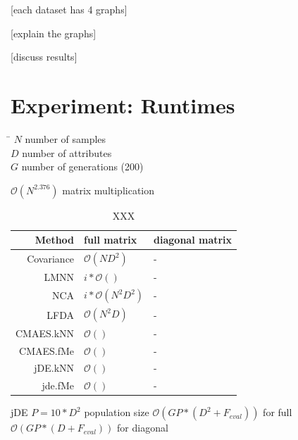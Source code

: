 \documentclass[12pt,a4paper]{report}
\begin{document}
[each dataset has 4 graphs] %

[explain the graphs] %

[discuss results] %



\section{Experiment: Runtimes} \label{chap:exp:runtimes}

\begin{tabbing}
\hspace{50pt}\=\kill
$N$ \> number of samples \\
$D$ \> number of attributes \\ 
$G$ \> number of generations (200) \\
\end{tabbing} 

$\mathcal{O}(N^{2.376})$ matrix multiplication 

\begin{table}[ht] \centering
\begin{tabular}{rll}
\hline
Method & full matrix & diagonal matrix \\
\hline
Covariance & $\mathcal{O}(ND^2)$ & - \\
LMNN & $i*\mathcal{O}()$ & - \\
NCA & $i*\mathcal{O}(N^2D^2)$ & - \\
LFDA & $\mathcal{O}(N^2D)$ & - \\
CMAES.kNN & $\mathcal{O}()$ & - \\
CMAES.fMe & $\mathcal{O}()$ & - \\
jDE.kNN & $\mathcal{O}()$ & - \\
jde.fMe & $\mathcal{O}()$ & - \\ 
\hline
\end{tabular}
\caption{XXX} \label{tab:XXX}
\end{table}


jDE
$P=10*D^2$ population size
$\mathcal{O}(GP*(D^2+F_{eval}))$ for full
$\mathcal{O}(GP*(D+F_{eval}))$ for diagonal
\end{document}
